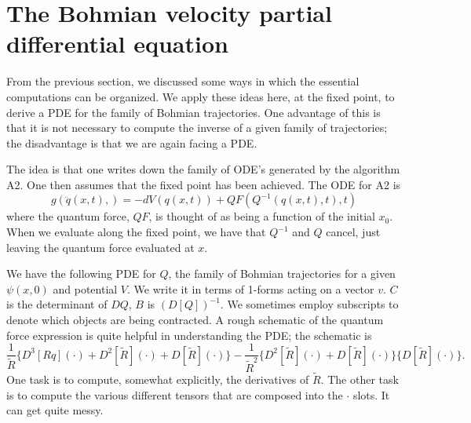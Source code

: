 \documentclass[11pt]{article}
\theoremstyle{remark}
\begin{document}
\section{The Bohmian velocity partial differential equation}

From the previous section, we discussed some ways in which the
essential computations can be organized. We apply these ideas here, at
the fixed point, to derive a PDE for the family of Bohmian trajectories. 
One advantage of this is that it is not necessary to compute the
inverse of a given family of trajectories; the disadvantage is that
we are again facing a PDE. 

The idea is that one writes down the family of ODE's generated by the
algorithm  A2. One then assumes that the fixed point has been
achieved. The ODE for A2 is 
\[
g(\ddot{q} (x,t), ) = -dV(q(x,t)) + QF(Q^{-1}(q(x,t),t),t)
\]
where the quantum force, $QF$, is thought of as being a function of
the initial $x_0$. When we evaluate along the fixed point, we
have that $Q^{-1}$ and $Q$ cancel, just leaving the quantum force evaluated
at $x$. 

We have the following PDE for $Q$, the family of Bohmian trajectories
for a given $\ensuremath{\psi}(x,0)$ and potential $V$. We write it in terms of
1-forms acting on a vector $v$. 
$C$ is the determinant of $DQ$, $B$ is $(D[Q])^{-1}$. We
sometimes employ subscripts to denote which objects are being contracted.  
A rough schematic of the quantum force expression is quite helpful in
understanding the PDE; the schematic is
\[
\frac{1}{\ensuremath{\tilde R}}\{D^3 [Rq] (\cdot) +D^2[\ensuremath{\tilde R}] (\cdot) +D[\ensuremath{\tilde R}] (\cdot) \}
- \frac{1}{\ensuremath{\tilde R}^2} \{D^2[\ensuremath{\tilde R}](\cdot) +D[\ensuremath{\tilde R}](\cdot)  \}\{D[\ensuremath{\tilde R}](\cdot) \}.
\]
One task is to compute, somewhat explicitly, the derivatives of
\ensuremath{\tilde R}. The other task is to compute the various different tensors that
are composed into the $\cdot$ slots. It can get quite messy.
\end{document}
